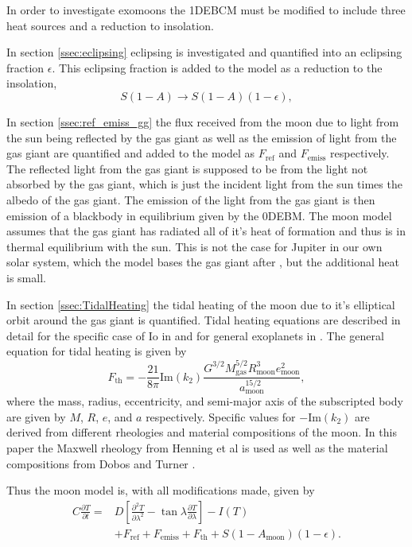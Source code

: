 \documentclass[12pt, onecolumn]{revtex4-2}    %
\newcommand{\partialderiv}[2]{\frac{\partial {#1}}{\partial {#2}}}
\newcommand{\partialderivsecnd}[2]{\frac{\partial^2 {#1}}{\partial {#2}^2}}
\begin{document}
In order to investigate exomoons the 1DEBCM must be modified to include three heat sources and a reduction to insolation.

In section \ref{ssec:eclipsing} eclipsing is investigated and quantified into an eclipsing fraction $\epsilon$.
This eclipsing fraction is added to the model as a reduction to the insolation,
\begin{equation}
  S(1-A) \to S(1-A)(1-\epsilon),
  \label{eq:reduction_insolation}
\end{equation}

In section \ref{ssec:ref_emiss_gg} the flux received from the moon due to light from the sun being reflected by the gas giant as well as the emission of light from the gas giant are quantified and added to the model as $F_\text{ref}$ and $F_\text{emiss}$ respectively.
The reflected light from the gas giant is supposed to be from the light not absorbed by the gas giant, which is just the incident light from the sun times the albedo of the gas giant.
The emission of the light from the gas giant is then emission of a blackbody in equilibrium given by the 0DEBM.
The moon model assumes that the gas giant has radiated all of it's heat of formation and thus is in thermal equilibrium with the sun.
This is not the case for Jupiter in our own solar system, which the model bases the gas giant after \cite{LJW2018}, but the additional heat is small.

In section \ref{ssec:TidalHeating} the tidal heating of the moon due to it's elliptical orbit around the gas giant is quantified.
Tidal heating equations are described in detail for the specific case of Io in \cite{YP1981, Segatz1988} and for general exoplanets in \cite{DobosTurner2015, DHT2017}.
The general equation for tidal heating is given by
\begin{equation}
  F_\text{th} = -\frac{21}{8\pi} \text{Im}(k_2) \frac{G^{3/2} M_\text{gas}^{5/2} R_\text{moon}^{3} e_\text{moon}^2}{a_\text{moon}^{15/2}},
  \label{eq:tidalheating_flux}
\end{equation}
where the mass, radius, eccentricity, and semi-major axis of the subscripted body are given by $M$, $R$, $e$, and $a$ respectively.
Specific values for $-\text{Im}(k_2)$ are derived from different rheologies and material compositions of the moon.
In this paper the Maxwell rheology from Henning et al \cite{Henning2009} is used as well as the material compositions from Dobos and Turner \cite{DobosTurner2015}.

Thus the moon model is, with all modifications made, given by
\begin{equation}
  \begin{split}
    C \partialderiv{T}{t} =& D\left[\partialderivsecnd{T}{\lambda} - \tan\lambda\partialderiv{T}{\lambda}\right] - I(T) \\
    & + F_\text{ref} + F_\text{emiss} + F_\text{th} + S(1-A_\text{moon})(1-\epsilon).
  \end{split}
  \label{eq:1DEBCM_moon}
\end{equation}
\end{document}
